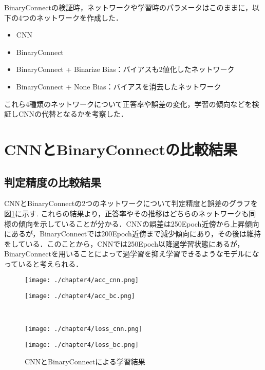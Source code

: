 BinaryConnectの検証時，ネットワークや学習時のパラメータはこのままに，以下の4つのネットワークを作成した．
\begin{itemize}
  \item CNN
  \item BinaryConnect
  \item BinaryConnect + Binarize Bias：バイアスも2値化したネットワーク
  \item BinaryConnect + None Bias：バイアスを消去したネットワーク
\end{itemize}
これら4種類のネットワークについて正答率や誤差の変化，学習の傾向などを検証しCNNの代替となるかを考察した．

\section{CNNとBinaryConnectの比較結果}
\subsection{判定精度の比較結果}
CNNとBinaryConnectの2つのネットワークについて判定精度と誤差のグラフを図\ref{fig_acc_loss_1}に示す.
これらの結果より，正答率やその推移はどちらのネットワークも同様の傾向を示していることが分かる．CNNの誤差は250Epoch近傍から上昇傾向にあるが，BinaryConnectでは200Epoch近傍まで減少傾向にあり，その後は維持をしている．このことから，CNNでは250Epoch以降過学習状態にあるが，BinaryConnectを用いることによって過学習を抑え学習できるようなモデルになっていると考えられる．
\begin{figure}[htbp]
  \begin{minipage}[b]{0.5\linewidth}
    \centering
    \texttt{[image: ./chapter4/acc\_cnn.png]}
  \end{minipage}
  \begin{minipage}[b]{0.5\linewidth}
    \centering
    \texttt{[image: ./chapter4/acc\_bc.png]}
    \label{fig_acc_bc}
  \end{minipage}\\
  \begin{minipage}[b]{0.5\linewidth}
    \centering
    \texttt{[image: ./chapter4/loss\_cnn.png]}
  \end{minipage}
  \begin{minipage}[b]{0.5\linewidth}
    \centering
    \texttt{[image: ./chapter4/loss\_bc.png]}
  \end{minipage}
  \caption{CNNとBinaryConnectによる学習結果}
  \label{fig_acc_loss_1}
\end{figure}

